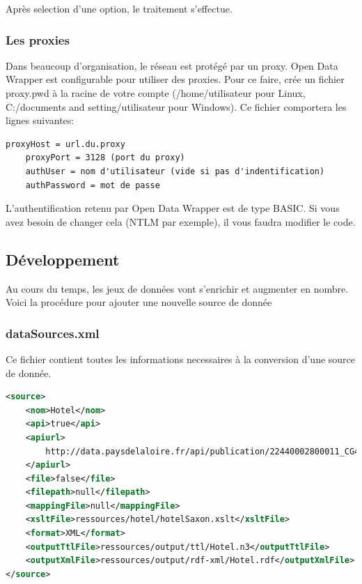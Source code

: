 \documentclass[a4paper]{article}
\begin{document}
Après selection d'une option, le traitement s'effectue.

\subsubsection{Les proxies}

Dans beaucoup d'organisation, le réseau est protégé par un proxy. Open Data
Wrapper est configurable pour utiliser des proxies. Pour ce faire, crée un
fichier proxy.pwd à la racine de votre compte (/home/utilisateur pour Linux,
C:/documents and setting/utilisateur pour Windows). Ce fichier comportera les
lignes suivantes:

\begin{lstlisting}[caption=Fichier de configuration des proxys proxy.pwd]
	proxyHost = url.du.proxy
	proxyPort = 3128 (port du proxy)
	authUser = nom d'utilisateur (vide si pas d'indentification)
	authPassword = mot de passe
\end{lstlisting}

L'authentification retenu par Open Data Wrapper est de type BASIC. Si vous avez
besoin de changer cela (NTLM par exemple), il vous faudra modifier le code.

\subsection{Développement}

Au cours du temps, les jeux de données vont s'enrichir et augmenter en nombre.
Voici la procédure pour ajouter une nouvelle source de donnée

\subsubsection{dataSources.xml}

Ce fichier contient toutes les informations necessaires à la conversion d'une
source de donnée.

\begin{lstlisting}[caption=Extrait de dataSources.xml, language=XML]
<source>
	<nom>Hotel</nom>
	<api>true</api>
	<apiurl>
		http://data.paysdelaloire.fr/api/publication/22440002800011_CG44_TOU_04815/hotels_STBL/content?format=xml
	</apiurl>
	<file>false</file>
	<filepath>null</filepath>
	<mappingFile>null</mappingFile>
	<xsltFile>ressources/hotel/hotelSaxon.xslt</xsltFile>
	<format>XML</format>
	<outputTtlFile>ressources/output/ttl/Hotel.n3</outputTtlFile>
	<outputXmlFile>ressources/output/rdf-xml/Hotel.rdf</outputXmlFile>
</source>
\end{lstlisting}
\end{document}
